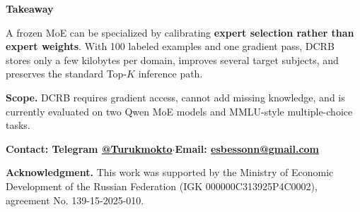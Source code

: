 \documentclass[final]{beamer}
\newcommand{\PosterSans}{\notosans}
\begin{document}
\begin{frame}[t]
\vspace{8.8mm}
\begin{tcolorbox}[enhanced,colback=PosterInk,colframe=PosterInk,boxrule=0pt,arc=3mm,
left=7mm,right=7mm,top=5mm,bottom=5mm,before skip=0mm,after skip=0mm]
{\PosterSans\bfseries\fontsize{37}{43}\selectfont\color{white}Takeaway}\par\vspace{1mm}
{\PosterSans\fontsize{28}{35}\selectfont\color{white}A frozen MoE can be specialized by calibrating \textbf{expert selection rather than expert weights}. With 100 labeled examples and one gradient pass, DCRB stores only a few kilobytes per domain, improves several target subjects, and preserves the standard Top-$K$ inference path.}\par\vspace{2mm}
{\PosterSans\fontsize{21}{26}\selectfont\color{white!85}\textbf{Scope.} DCRB requires gradient access, cannot add missing knowledge, and is currently evaluated on two Qwen MoE models and MMLU-style multiple-choice tasks.}
\end{tcolorbox}
\vspace{4mm}
{\PosterSans\bfseries\fontsize{24}{29}\selectfont\color{PosterInk}
Contact: Telegram \href{https://t.me/Turukmokto}{@Turukmokto}\quad$\cdot$\quad Email: \href{mailto:esbessonn@gmail.com}{esbessonn@gmail.com}}\par\vspace{1.5mm}
{\PosterSans\fontsize{17}{21}\selectfont\color{PosterMuted}\textbf{Acknowledgment.} This work was supported by the Ministry of Economic Development of the Russian Federation (IGK 000000C313925P4C0002), agreement No. 139-15-2025-010.}
\end{frame}
\end{document}
